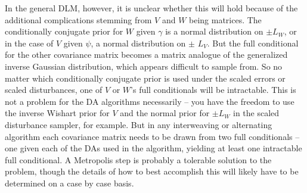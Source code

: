 \documentclass[12pt]{article}
\begin{document}
In the general DLM, however, it is unclear whether this will hold because of the additional complications stemming from $V$ and $W$ being matrices. The conditionally conjugate prior for $W$ given $\gamma$ is a normal distribution on $\pm L_W$, or in the case of $V$ given $\psi$, a normal distribution on $\pm$ $L_V$. But the full conditional for the other covariance matrix becomes a matrix analogue of the generalized inverse Gaussian distribution, which appears difficult to sample from. So no matter which conditionally conjugate prior is used under the scaled errors or scaled disturbances, one of $V$ or $W$'s full conditionals will be intractable. This is not a problem for the DA algorithms necessarily -- you have the freedom to use the inverse Wishart prior for $V$ and the normal prior for $\pm L_W$ in the scaled disturbance sampler, for example. But in any interweaving or alternating algorithm each covariance matrix needs to be drawn from two full conditionals -- one given each of the DAs used in the algorithm, yielding at least one intractable full conditional. A Metropolis step is probably a tolerable solution to the problem, though the details of how to best accomplish this will likely have to be determined on a case by case basis.
\end{document}
